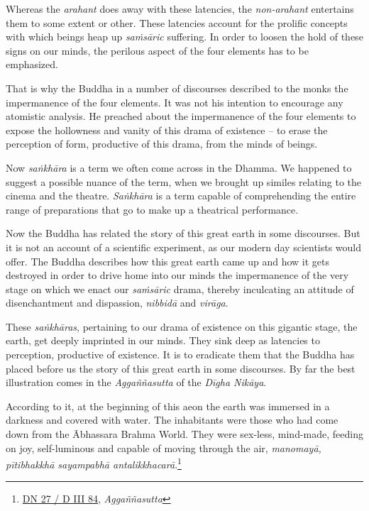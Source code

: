 Whereas the \emph{arahant} does away with these latencies, the \emph{non-arahant} entertains them to some extent or other. These latencies account for the prolific concepts with which beings heap up \emph{saṁsāric} suffering. In order to loosen the hold of these signs on our minds, the perilous aspect of the four elements has to be emphasized.

\clearpage

That is why the Buddha in a number of discourses described to the monks the impermanence of the four elements. It was not his intention to encourage any atomistic analysis. He preached about the impermanence of the four elements to expose the hollowness and vanity of this drama of existence -- to erase the perception of form, productive of this drama, from the minds of beings.

Now \emph{saṅkhāra} is a term we often come across in the Dhamma. We happened to suggest a possible nuance of the term, when we brought up similes relating to the cinema and the theatre. \emph{Saṅkhāra} is a term capable of comprehending the entire range of preparations that go to make up a theatrical performance.

Now the Buddha has related the story of this great earth in some discourses. But it is not an account of a scientific experiment, as our modern day scientists would offer. The Buddha describes how this great earth came up and how it gets destroyed in order to drive home into our minds the impermanence of the very stage on which we enact our \emph{saṁsāric} drama, thereby inculcating an attitude of disenchantment and dispassion, \emph{nibbidā} and \emph{virāga}.

These \emph{saṅkhāras}, pertaining to our drama of existence on this gigantic stage, the earth, get deeply imprinted in our minds. They sink deep as latencies to perception, productive of existence. It is to eradicate them that the Buddha has placed before us the story of this great earth in some discourses. By far the best illustration comes in the \emph{Aggaññasutta} of the \emph{Dīgha Nikāya}.

According to it, at the beginning of this aeon the earth was immersed in a darkness and covered with water. The inhabitants were those who had come down from the Ābhassara Brahma World. They were sex-less, mind-made, feeding on joy, self-luminous and capable of moving through the air, \emph{manomayā, pītibhakkhā sayampabhā antalikkhacarā}.\footnote{\href{https://suttacentral.net/dn27/pli/ms}{DN 27 / D III 84}, \emph{Aggaññasutta}}

